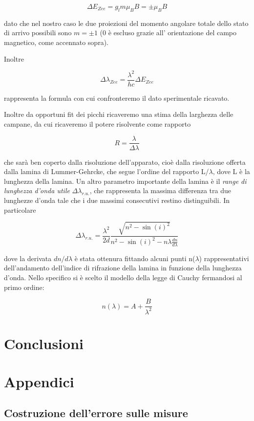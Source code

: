 \documentclass{article}
\begin{document}
\[
\Delta E_{Zee} = g_l m \mu_B B = \pm \mu_B B
\]

dato che nel nostro caso le due proiezioni del momento angolare totale
dello stato di arrivo possibili sono $m = \pm 1$ (0 è escluso grazie all'
orientazione del campo magnetico, come accennato sopra).

Inoltre

\[
\Delta\lambda_{Zee} = \frac{\lambda^2}{hc}\Delta E_{Zee}
\]

rappresenta la formula con cui confronteremo il dato sperimentale
ricavato.

Inoltre da opportuni fit dei picchi ricaveremo una stima della larghezza
delle campane, da cui ricaveremo il potere risolvente come rapporto

\[
R = \frac{\lambda}{\Delta\lambda}    
\]

che sarà ben coperto dalla risoluzione dell'apparato, cioè dalla
risoluzione offerta dalla lamina di Lummer-Gehrcke, che segue l'ordine
del rapporto L/$\lambda$, dove L è la lunghezza della lamina.
Un altro parametro importante della lamina è il \textit{range di 
lunghezza d'onda utile} $\Delta\lambda_{r.u.}$, che rappresenta la
massima differenza tra due lunghezze d'onda tale che i due massimi 
consecutivi restino distinguibili. In particolare

\[
\Delta\lambda_{r.u.} = \frac{\lambda^2}{2d}\frac{\sqrt{n^2-\sin(i)^2}}{n^2-\sin(i)^2-n\lambda\frac{dn}{d\lambda}}
\]

dove la derivata $dn/d\lambda$ è stata ottenura fittando alcuni punti 
n($\lambda$) rappresentativi dell'andamento dell'indice di rifrazione
della lamina in funzione della lunghezza d'onda. Nello specifico si è
scelto il modello della legge di Cauchy fermandosi al primo ordine:

\[
n(\lambda) = A + \frac{B}{\lambda^2}    
\]



\section{Conclusioni}



\newpage
\appendix
\section{Appendici}
\label{appendice}
\subsection{Costruzione dell'errore sulle misure}
\label{Calcerr}
\end{document}
